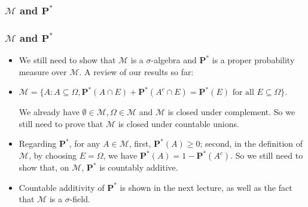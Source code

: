 \documentclass[%
]{beamer}
\newcommand{\BP}{\mathbf{P}}
\begin{document}
\subsubsection{ $\mathcal{M}$ and $\BP^*$}
\frame
{
  \frametitle{$\mathcal{M}$ and $\BP^*$}

   \begin{itemize}

            \item<1-> We still need to show that $\mathcal{M}$ is a $\sigma$-algebra and $\BP^*$ is a proper probability measure over $\mathcal{M}$. A review of our results so far:
            
              \item<2-> $\mathcal{M}=\{A: A\subseteq \Omega, \BP^*(A\cap E)+\BP^*(A^c\cap E)=\BP^*(E) \text{ for all }E\subseteq \Omega \}$.
              
              We already have $\emptyset \in \mathcal{M}, \Omega \in \mathcal{M}$ and $\mathcal{M}$ is closed under complement. So we still need to prove that $\mathcal{M}$ is closed under countable unions. 
                       
              \item<3-> Regarding $\BP^*$, for any $A\in\mathcal{M}$, first, $\BP^*(A)\geq 0$; second, in the definition of $\mathcal{M}$, by choosing $E=\Omega$, we have $\BP^*(A)=1- \BP^*(A^c)$. So we still need to show that, on $\mathcal{M}$, $\BP^*$ is countably additive. 
              
              \item<4-> Countable additivity of $\BP^*$ is shown in the next lecture, as well as the fact that $\mathcal{M}$ is a $\sigma$-field. 
              
%              
                             
                 \end{itemize}
}
\end{document}
